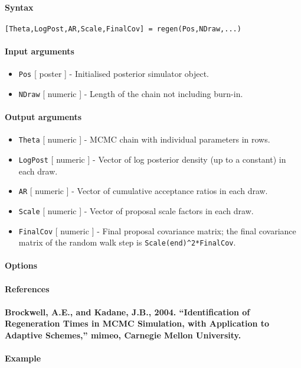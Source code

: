 


	\paragraph{Syntax}

\begin{verbatim}
[Theta,LogPost,AR,Scale,FinalCov] = regen(Pos,NDraw,...)
\end{verbatim}

\paragraph{Input arguments}

\begin{itemize}
\item
  \texttt{Pos} {[} poster {]} - Initialised posterior simulator object.
\item
  \texttt{NDraw} {[} numeric {]} - Length of the chain not including
  burn-in.
\end{itemize}

\paragraph{Output arguments}

\begin{itemize}
\item
  \texttt{Theta} {[} numeric {]} - MCMC chain with individual parameters
  in rows.
\item
  \texttt{LogPost} {[} numeric {]} - Vector of log posterior density (up
  to a constant) in each draw.
\item
  \texttt{AR} {[} numeric {]} - Vector of cumulative acceptance ratios
  in each draw.
\item
  \texttt{Scale} {[} numeric {]} - Vector of proposal scale factors in
  each draw.
\item
  \texttt{FinalCov} {[} numeric {]} - Final proposal covariance matrix;
  the final covariance matrix of the random walk step is
  \texttt{Scale(end)\^{}2*FinalCov}.
\end{itemize}

\paragraph{Options}

\paragraph{References}

\paragraph{Brockwell, A.E., and Kadane, J.B., 2004. ``Identification of
Regeneration Times in MCMC Simulation, with Application to Adaptive
Schemes,'' mimeo, Carnegie Mellon
University.}

\paragraph{Example}


